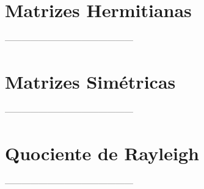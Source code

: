 \section{Matrizes Hermitianas}

	---------------------------------------------
	
\section{Matrizes Simétricas}
	
	---------------------------------------------
	
\section{Quociente de Rayleigh}
	
	---------------------------------------------